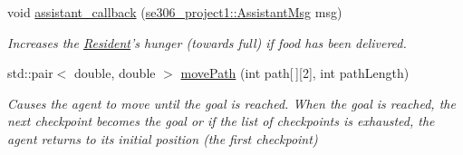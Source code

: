 \begin{DoxyCompactItemize}
\item 
void \hyperlink{classResident_aa715d491e917de6f621593f0d1f01bd6}{assistant\-\_\-callback} (\hyperlink{structse306__project1_1_1AssistantMsg__}{se306\-\_\-project1\-::\-Assistant\-Msg} msg)
\begin{DoxyCompactList}\small\item\em Increases the \hyperlink{classResident}{Resident}'s hunger (towards full) if food has been delivered. \end{DoxyCompactList}\item 
std\-::pair$<$ double, double $>$ \hyperlink{classResident_a0cfe1d9b185beed7d3438157cc69db05}{move\-Path} (int path\mbox{[}$\,$\mbox{]}\mbox{[}2\mbox{]}, int path\-Length)
\begin{DoxyCompactList}\small\item\em Causes the agent to move until the goal is reached. When the goal is reached, the next checkpoint becomes the goal or if the list of checkpoints is exhausted, the agent returns to its initial position (the first checkpoint) \end{DoxyCompactList}\end{DoxyCompactItemize}

